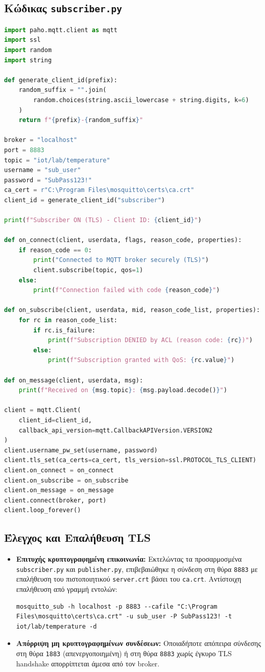 \documentclass[11pt, a4paper]{article}
\begin{document}
\subsection{Κώδικας \texttt{subscriber.py}}
\begin{lstlisting}[language=Python]
import paho.mqtt.client as mqtt
import ssl
import random
import string

def generate_client_id(prefix):
    random_suffix = "".join(
        random.choices(string.ascii_lowercase + string.digits, k=6)
    )
    return f"{prefix}-{random_suffix}"

broker = "localhost"
port = 8883
topic = "iot/lab/temperature"
username = "sub_user"
password = "SubPass123!"
ca_cert = r"C:\Program Files\mosquitto\certs\ca.crt"
client_id = generate_client_id("subscriber")

print(f"Subscriber ON (TLS) - Client ID: {client_id}")

def on_connect(client, userdata, flags, reason_code, properties):
    if reason_code == 0:
        print("Connected to MQTT broker securely (TLS)")
        client.subscribe(topic, qos=1)
    else:
        print(f"Connection failed with code {reason_code}")

def on_subscribe(client, userdata, mid, reason_code_list, properties):
    for rc in reason_code_list:
        if rc.is_failure:
            print(f"Subscription DENIED by ACL (reason code: {rc})")
        else:
            print(f"Subscription granted with QoS: {rc.value}")

def on_message(client, userdata, msg):
    print(f"Received on {msg.topic}: {msg.payload.decode()}")

client = mqtt.Client(
    client_id=client_id,
    callback_api_version=mqtt.CallbackAPIVersion.VERSION2
)
client.username_pw_set(username, password)
client.tls_set(ca_certs=ca_cert, tls_version=ssl.PROTOCOL_TLS_CLIENT)
client.on_connect = on_connect
client.on_subscribe = on_subscribe
client.on_message = on_message
client.connect(broker, port)
client.loop_forever()
\end{lstlisting}

\subsection{Έλεγχος και Επαλήθευση TLS}
\begin{itemize}
    \item \textbf{Επιτυχής κρυπτογραφημένη επικοινωνία:} Εκτελώντας τα προσαρμοσμένα \texttt{subscriber.py} και \texttt{publisher.py}, επιβεβαιώθηκε η σύνδεση στη θύρα \texttt{8883} με επαλήθευση του πιστοποιητικού \texttt{server.crt} βάσει του \texttt{ca.crt}. Αντίστοιχη επαλήθευση από γραμμή εντολών:
\begin{lstlisting}[language={}]
mosquitto_sub -h localhost -p 8883 --cafile "C:\Program Files\mosquitto\certs\ca.crt" -u sub_user -P SubPass123! -t iot/lab/temperature -d
\end{lstlisting}
    \item \textbf{Απόρριψη μη κρυπτογραφημένων συνδέσεων:} Οποιαδήποτε απόπειρα σύνδεσης στη θύρα \texttt{1883} (απενεργοποιημένη) ή στη θύρα \texttt{8883} χωρίς έγκυρο TLS handshake απορρίπτεται άμεσα από τον broker.
\end{itemize}
\end{document}
